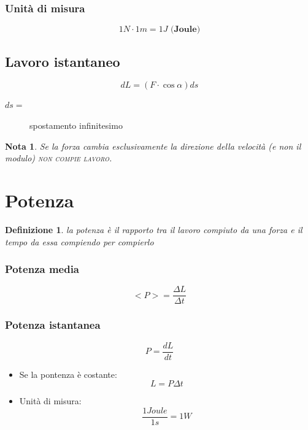 \documentclass{book}
\newtheorem{defi}{Definizione}[section]
\newtheorem{nota}{Nota}[section]
\begin{document}
\subsubsection{Unità di misura}
\label{sec:joule}

\begin{equation}
  \label{eq:joule}
  1N\cdot 1m=1J \textbf{ (Joule)}
\end{equation}

\subsection{Lavoro istantaneo}
\label{sec:lavoroistantaneo}

\begin{equation}
  \label{eq:lavista}
  dL=(F\cdot \cos \alpha)ds
\end{equation}
\begin{description}
\item[$ds=$] spostamento infinitesimo
\end{description}
\begin{nota}
  Se la forza cambia esclusivamente la direzione della velocità (\textit{e non il modulo}) \textsc{non compie lavoro}.
\end{nota}

\section{Potenza}
\label{sec:potenza}

\begin{defi}
  la potenza è il rapporto tra il lavoro compiuto da una forza e il tempo da essa compiendo per compierlo
\end{defi}
\begin{multicols}{2}
  \subsubsection{Potenza media}
  \label{sec:potmedia}
  \begin{equation}
    \label{eq:potmedia}
    <P>=\frac{\Delta L}{\Delta t}
  \end{equation}
  
  \subsubsection{Potenza istantanea}
  \label{sec:potistant}
  \begin{equation}
    \label{eq:potistant}
    P=\frac{dL}{dt}
  \end{equation}
\end{multicols}
\begin{itemize}
\item Se la pontenza è costante:
  \begin{equation}
    \label{eq:potconst}
    L=P\Delta t
  \end{equation}
\item Unità di misura:
  \begin{equation}
    \label{eq:unitadimisura}
    \frac{1 Joule}{1s}=1W
  \end{equation}
\end{itemize}
\end{document}
